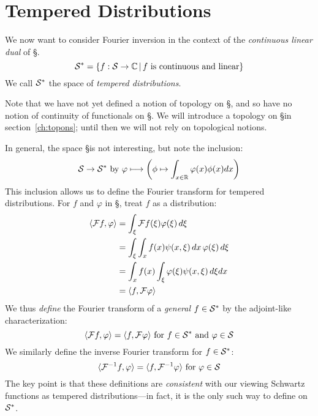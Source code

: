     \section{Tempered Distributions}
      We now want to consider Fourier inversion in the context of the \emph{continuous linear dual} of \S.
      \begin{equation*}
        \S^* = \{f:\S\rightarrow\C\,\vert\,f\text{ is continuous and linear}\}
      \end{equation*}
      We call $\S^*$ the space of \emph{tempered distributions}.

      Note that we have not yet defined a notion of topology on \S, and so have no notion of continuity of functionals on \S.
      We will introduce a topology on \S in section~\ref{ch:topons}; until then we will not rely on topological notions.

      In general, the space \S is not interesting, but note the inclusion:
      \begin{equation*}
        \S\rightarrow\S^*\text{ by }\varphi \longmapsto\left(\phi\mapsto\int_{x\in\R}\varphi(x)\phi(x)dx\right)
      \end{equation*}
      This inclusion allows us to define the Fourier transform for tempered distributions.
      For $f$ and $\varphi$ in \S, treat $f$ as a distribution:
      \begin{align*}
        \langle\F f,\varphi\rangle &= \int_\xi\F f(\xi)\varphi(\xi)\,d\xi\\
        &= \int_\xi\int_xf(x)\psi(x,\xi)\,dx\,\varphi(\xi)\,d\xi\\
        &= \int_xf(x)\int_\xi\varphi(\xi)\psi(x,\xi)\,d\xi dx\\
        &= \langle f,\F\varphi\rangle
      \end{align*}
      We thus \emph{define} the Fourier transform of a \emph{general} $f\in\S^*$ by the adjoint-like characterization:
      \begin{equation*}
        \langle\F f,\varphi\rangle = \langle f,\F\varphi\rangle \text{ for }f\in\S^*\text{ and }\varphi\in\S
      \end{equation*}
      We similarly define the inverse Fourier transform for $f\in\S^*$:
      \begin{equation*}
        \langle\F^{-1}f,\varphi\rangle = \langle f,\F^{-1}\varphi\rangle\text{ for }\varphi\in\S
      \end{equation*}
      The key point is that these definitions are \emph{consistent} with our viewing Schwartz functions as tempered distributions---in fact, it is the only such way to define \F on $\S^*$.

